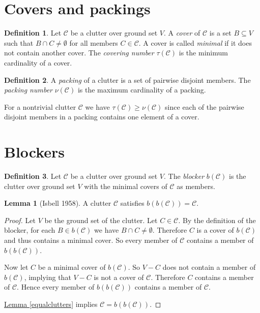 \documentclass[a4paper, 12pt]{scrbook}
\theoremstyle{definition}
\newtheorem*{definition}{Definition}
\newtheorem{lemma}[theorem]{Lemma}
\begin{document}
\section{Covers and packings}
\begin{definition}
    Let $\mathcal{C}$ be a clutter over ground set $V$.
    A \emph{cover} of $\mathcal{C}$ is a set $B \subseteq V$ such that $B \cap C \neq \emptyset$ for all members $C \in \mathcal{C}$.
    A cover is called \emph{minimal} if it does not contain another cover.
    The \emph{covering number} $\tau(\mathcal{C})$ is the minimum cardinality of a cover.
\end{definition}

\begin{definition}
    A \emph{packing} of a clutter is a set of pairwise disjoint members.
    The \emph{packing number} $\nu(\mathcal{C})$ is the maximum cardinality of a packing.
\end{definition}

For a nontrivial clutter $\mathcal{C}$ we have $\tau(\mathcal{C}) \geq \nu(\mathcal{C})$ since each of the pairwise disjoint members in a packing contains one element of a cover.

\section{Blockers}
\begin{definition}
    Let $\mathcal{C}$ be a clutter over ground set $V$.
    The \emph{blocker} $b(\mathcal{C})$ is the clutter over ground set $V$ with the minimal covers of $\mathcal{C}$ as members.
\end{definition}

\begin{lemma}[Isbell 1958]
    A clutter $\mathcal{C}$ satisfies $b(b(\mathcal{C}))=\mathcal{C}$.
\end{lemma}

\begin{proof}
    Let $V$ be the ground set of the clutter.
    Let $C \in \mathcal{C}$.
    By the definition of the blocker, for each $B \in b(\mathcal{C})$ we have $B\cap C \neq \emptyset$.
    Therefore $C$ is a cover of $b(\mathcal{C})$ and thus contains a minimal cover.
    So every member of $\mathcal{C}$ contains a member of $b(b(\mathcal{C}))$.

    Now let $C$ be a minimal cover of $b(\mathcal{C})$.
    So $V-C$ does not contain a member of $b(\mathcal{C})$, implying that $V-C$ is not a cover of $\mathcal{C}$.
    Therefore $C$ contains a member of $\mathcal{C}$.
    Hence every member of $b(b(\mathcal{C}))$ contains a member of $\mathcal{C}$.

    \hyperref[equalclutters]{Lemma \ref*{equalclutters}} implies $\mathcal{C}=b(b(\mathcal{C}))$.
\end{proof}
\end{document}
